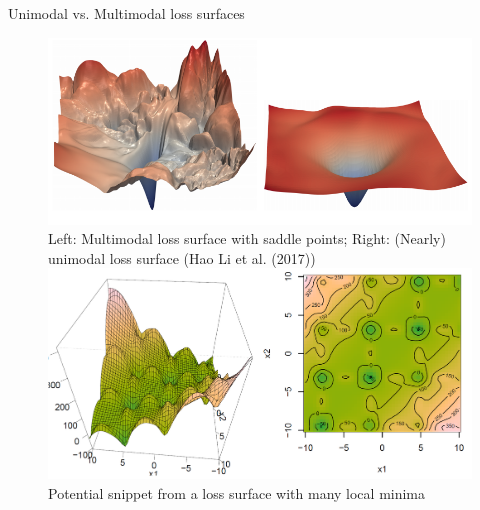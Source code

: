 \documentclass[11pt,compress,t,notes=noshow, xcolor=table]{beamer}
\begin{document}
\begin{vbframe}{Unimodal vs. Multimodal loss surfaces}
\begin{figure}
\centering
\includegraphics[width=12cm]{figure_man/difficult_vs_easy.png}
\footnotesize{Left: Multimodal loss surface with saddle points; Right: (Nearly) unimodal loss surface (Hao Li et al. (2017))}
\centering
\vspace{1cm}
\includegraphics[width=.9\textwidth]{figure_man/multimodal.png}
\footnotesize{Potential snippet from a loss surface with many local minima}
\end{figure}

\end{vbframe}

\end{document}
